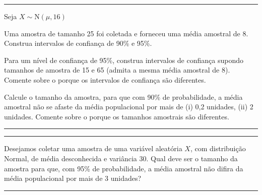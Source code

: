 \documentclass[a4paper,11pt,fleqn]{article}\usepackage[]{graphicx}\usepackage[]{color}
\theoremstyle{definition}
\begin{document}
\vspace{0.3cm}
\hrule
\vspace{0.3cm}

\begin{compactenum}[6.] %
\item Seja $X \sim \text{N}(\mu, 16)$
  \begin{compactenum}
  \item Uma amostra de tamanho 25 foi coletada e forneceu uma média
    amostral de 8. Construa intervalos de confiança de 90\% e 95\%.
  \item Para um nível de confiança de 95\%, construa intervalos de
    confiança supondo tamanhos de amostra de 15 e 65 (admita a mesma
    média amostral de 8). Comente sobre o porque os intervalos de
    confiança são diferentes.
  \item Calcule o tamanho da amostra, para que com 90\% de
    probabilidade, a média amostral não se afaste da média populacional
    por mais de (i) 0,2 unidades, (ii) 2 unidades. Comente sobre o
    porque os tamanhos amostrais são diferentes.
  \end{compactenum}
\end{compactenum}

\vspace{0.3cm}
\hrule
\vspace{0.3cm}

\clearpage

\vspace{0.3cm}
\hrule
\vspace{0.3cm}

\begin{compactenum}[7.] %
\item Desejamos coletar uma amostra de uma variável aleatória $X$, com
  distribuição Normal, de média desconhecida e variância 30. Qual deve
  ser o tamanho da amostra para que, com 95\% de probabilidade, a média
  amostral não difira da média populacional por mais de 3 unidades?
\end{compactenum}

\vspace{0.3cm}
\hrule
\vspace{0.3cm}
\end{document}
